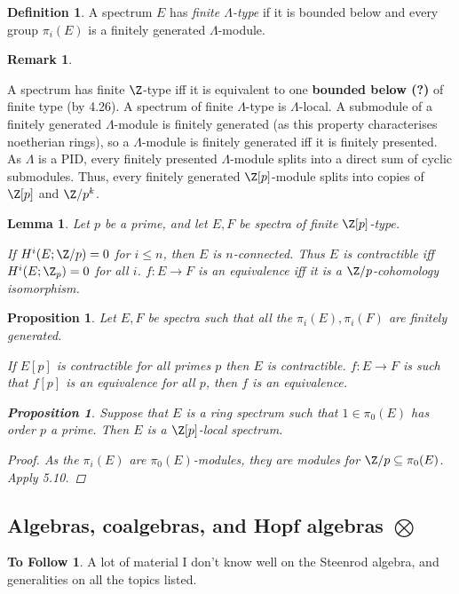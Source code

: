 \documentclass[11pt]{article}
\renewcommand{\comment}{}
\theoremstyle{plain}
\newtheorem{lem}[thm]{Lemma}
\newtheorem{prop}[thm]{Proposition}
\theoremstyle{definition}
\newtheorem{defn}[thm]{Definition}
\newtheorem{rmk}[thm]{Remark}
\newtheorem*{ToFollow}{To Follow}
\begin{document}
{\begin{defn}
A spectrum $E$ has \emph{finite $\Lambda$-type} if it is bounded below and every
group $\pi_i(E)$ is a finitely generated $\Lambda$-module.
\end{defn}
\begin{rmk}\hfil
\begin{itemise}
\itm A spectrum has finite $\Z$-type iff it is equivalent to one \textbf{bounded
below (?)} of finite type (by 4.26).
\itm A spectrum of finite $\Lambda$-type is $\Lambda$-local.
\itm A submodule of a finitely generated $\Lambda$-module is finitely generated
(as this property characterises noetherian rings), so a $\Lambda$-module is
finitely generated iff it is finitely presented. As $\Lambda$ is a PID, every
finitely presented $\Lambda$-module splits into a direct sum of cyclic
submodules. Thus, every finitely generated $\Z[p]$-module splits into copies of
$\Z[p]$ and $\Z/p^k$.
\end{itemise}
\end{rmk}
\begin{lem}Let $p$ be a prime, and let $E,F$ be spectra of finite $\Z[p]$-type.
\begin{itemise}
\itm[(i)] If $H^i(E;\Z/p)=0$ for $i\leq n$, then $E$ is $n$-connected. Thus $E$
is contractible iff $H^i(E;\Z_p)=0$ for all $i$.
\itm[(ii)] $f:E\to F$ is an equivalence iff it is a $\Z/p$-cohomology
isomorphism.
\end{itemise}
\end{lem}
\begin{prop}Let $E,F$ be spectra such that all the $\pi_i(E),\pi_i(F)$ are
finitely generated.
\begin{itemise}
\itm[(i)] If $E[p]$ is contractible for all primes $p$ then $E$ is contractible.
\itm[(ii)] $f:E\to F$ is such that $f[p]$ is an equivalence for all $p$, then
$f$ is an equivalence.
\end{itemise}
\begin{prop}
Suppose that $E$ is a ring spectrum such that $1\in\pi_0(E)$ has order $p$ a
prime. Then $E$ is a $\Z[p]$-local spectrum.
\end{prop}
\begin{proof}
As the $\pi_i(E)$ are $\pi_0(E)$-modules, they are modules for
$\Z/p\subseteq\pi_0(E)$. Apply 5.10.
\end{proof}
\end{prop}
}   %
\subsection{Algebras, coalgebras, and Hopf algebras
\texorpdfstring{$\bigotimes$}{}}
\comment{
\begin{ToFollow}
A lot of material I don't know well on the Steenrod algebra, and generalities on
all the topics listed.
\end{ToFollow}
}   %
\end{document}
